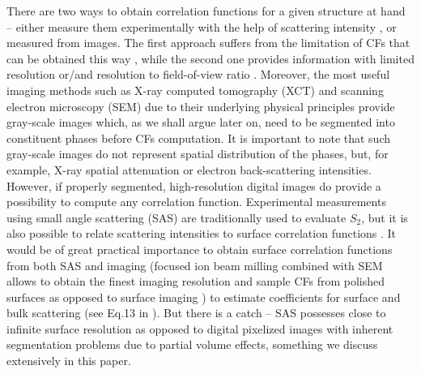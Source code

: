 \documentclass[reprint,amsmath,amssymb,aps,pre,showkeys,showpacs]{revtex4-1}
\begin{document}
There are two ways to obtain correlation functions for a given structure at hand
-- either measure them experimentally with the help of scattering intensity
\cite{debye1957scattering,li2018accurate}, or measured from images. The first
approach suffers from the limitation of CFs that can be obtained this way
\cite{Gommes_notchord}, while the second one provides information with limited
resolution or/and resolution to field-of-view ratio \cite{SciRep1}. Moreover,
the most useful imaging methods such as X-ray computed tomography (XCT) and
scanning electron microscopy (SEM) due to their underlying physical principles
provide gray-scale images which, as we shall argue later on, need to be
segmented into constituent phases before CFs computation. It is important to
note that such gray-scale images do not represent spatial distribution of the
phases, but, for example, X-ray spatial attenuation or electron back-scattering
intensities. However, if properly segmented, high-resolution digital images do
provide a possibility to compute any correlation function. Experimental
measurements using small angle scattering (SAS) are traditionally used to
evaluate $S_2$, but it is also possible to relate scattering intensities to
surface correlation functions \cite{dietrich1995scattering,ma2018SS}. It would
be of great practical importance to obtain surface correlation functions from
both SAS and imaging (focused ion beam milling combined with SEM allows to
obtain the finest imaging resolution and sample CFs from
polished surfaces as opposed to surface imaging \cite{FIB-SEMpaper}) to estimate
coefficients for surface and bulk scattering (see Eq.13 in \cite{ma2018SS}). But
there is a catch -- SAS possesses close to infinite surface resolution as
opposed to digital pixelized images with inherent segmentation problems due to
partial volume effects, something we discuss extensively in this paper.
\end{document}
